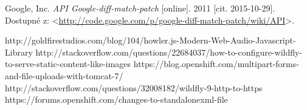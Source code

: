 \documentclass[12pt,oneside]{fithesis2}
\begin{document}
\begin{thebibliography}{59}
  		Google, Inc.
  		\emph{API Google-diff-match-patch}
  		[online].
  		2011
  		[cit. 2015-10-29].
  		Dostupné z: <\url{http://code.google.com/p/google-diff-match-patch/wiki/API}>.
  		
  		http://goldfirestudios.com/blog/104/howler.js-Modern-Web-Audio-Javascript-Library
  		http://stackoverflow.com/questions/22684037/how-to-configure-wildfly-to-serve-static-content-like-images
  		https://blog.openshift.com/multipart-forms-and-file-uploads-with-tomcat-7/
  		http://stackoverflow.com/questions/32008182/wildfly-9-http-to-https
  		https://forums.openshift.com/changes-to-standalonexml-file
  			
	\end{thebibliography}
\end{document}
